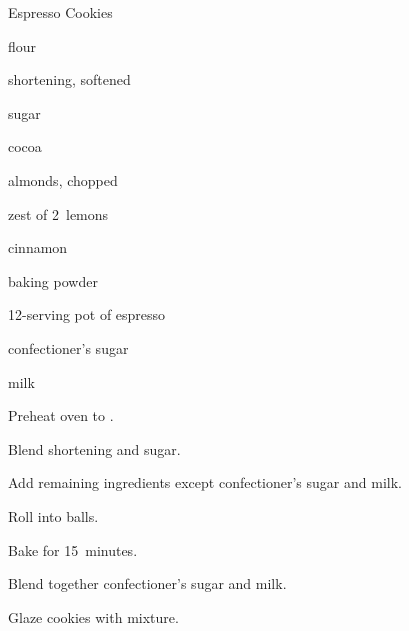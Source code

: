 \begin{recipe}{Espresso Cookies}{}{}

\begin{ingredients}
\item {} flour
\item {} shortening, softened
\item {} sugar
\item {} cocoa
\item {} almonds, chopped
\item zest of 2~lemons
\item {} cinnamon
\item {} baking powder
\item 12-serving pot of espresso
\item confectioner's sugar
\item milk
\end{ingredients}

\begin{directions}
\item Preheat oven to .
\item Blend shortening and sugar.
\item Add remaining ingredients except confectioner's sugar and milk.
\item Roll into balls.
\item Bake for 15~minutes.
\item Blend together confectioner's sugar and milk.
\item Glaze cookies with mixture.
\end{directions}

\end{recipe}
